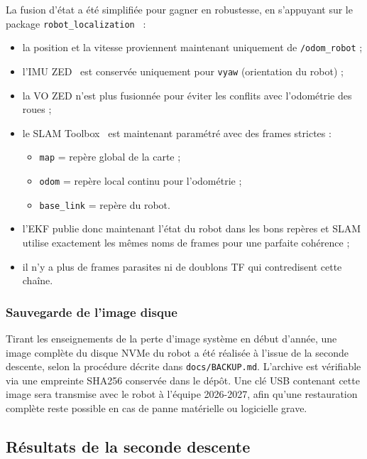\documentclass[12pt,a4paper]{article}
\begin{document}
La fusion d'état a été simplifiée pour gagner en robustesse, en s'appuyant sur le package \texttt{robot\_localization}~\cite{robot_localization} :
\begin{itemize}
    \item la position et la vitesse proviennent maintenant uniquement de \texttt{/odom\_robot} ;
    \item l'IMU ZED~\cite{zed_ros2_wrapper} est conservée uniquement pour \texttt{vyaw} (orientation du robot) ;
    \item la VO ZED n'est plus fusionnée pour éviter les conflits avec l'odométrie des roues ;
    \item le SLAM Toolbox~\cite{slam_toolbox} est maintenant paramétré avec des frames strictes : \begin{itemize}
        \item \texttt{map} = repère global de la carte ;
        \item \texttt{odom} = repère local continu pour l’odométrie ;
        \item \texttt{base\_link} = repère du robot.
    \end{itemize} 
    \item l’EKF publie donc maintenant l’état du robot dans les bons repères et SLAM utilise exactement les mêmes noms de frames pour une parfaite cohérence ;
    \item il n’y a plus de frames parasites ni de doublons TF qui contredisent cette chaîne.
\end{itemize}

\subsubsection{Sauvegarde de l'image disque}

Tirant les enseignements de la perte d'image système en début d'année, une image complète du disque NVMe du robot a été réalisée à l'issue de la seconde descente, selon la procédure décrite dans \texttt{docs/BACKUP.md}. L'archive est vérifiable via une empreinte SHA256 conservée dans le dépôt. Une clé USB contenant cette image sera transmise avec le robot à l'équipe 2026-2027, afin qu'une restauration complète reste possible en cas de panne matérielle ou logicielle grave.


\subsection{Résultats de la seconde descente}
\end{document}
